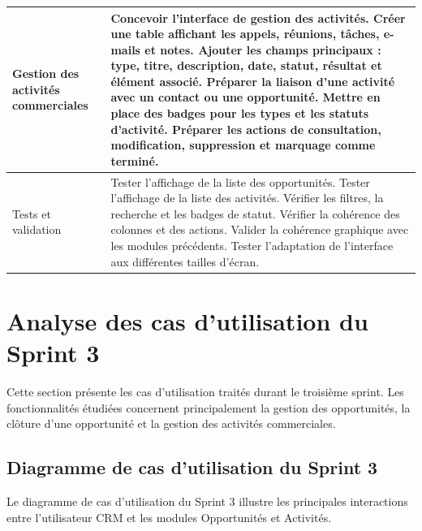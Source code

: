 \documentclass[12pt,a4paper]{report}
\begin{document}
\begin{table}[h]
{\begin{tabular}{|p{4cm}|p{10.5cm}|}
Gestion des activités commerciales
&
Concevoir l’interface de gestion des activités. \newline
Créer une table affichant les appels, réunions, tâches, e-mails et notes. \newline
Ajouter les champs principaux : type, titre, description, date, statut, résultat et élément associé. \newline
Préparer la liaison d’une activité avec un contact ou une opportunité. \newline
Mettre en place des badges pour les types et les statuts d’activité. \newline
Préparer les actions de consultation, modification, suppression et marquage comme terminé. \\
\hline

Tests et validation
&
Tester l’affichage de la liste des opportunités. \newline
Tester l’affichage de la liste des activités. \newline
Vérifier les filtres, la recherche et les badges de statut. \newline
Vérifier la cohérence des colonnes et des actions. \newline
Valider la cohérence graphique avec les modules précédents. \newline
Tester l’adaptation de l’interface aux différentes tailles d’écran. \\
\hline

\end{tabular}
}
\end{table}

\section{Analyse des cas d’utilisation du Sprint 3}

Cette section présente les cas d’utilisation traités durant le troisième sprint. Les fonctionnalités étudiées concernent principalement la gestion des opportunités, la clôture d’une opportunité et la gestion des activités commerciales.

\subsection{Diagramme de cas d’utilisation du Sprint 3}

Le diagramme de cas d’utilisation du Sprint 3 illustre les principales interactions entre l’utilisateur CRM et les modules Opportunités et Activités.
\end{document}
